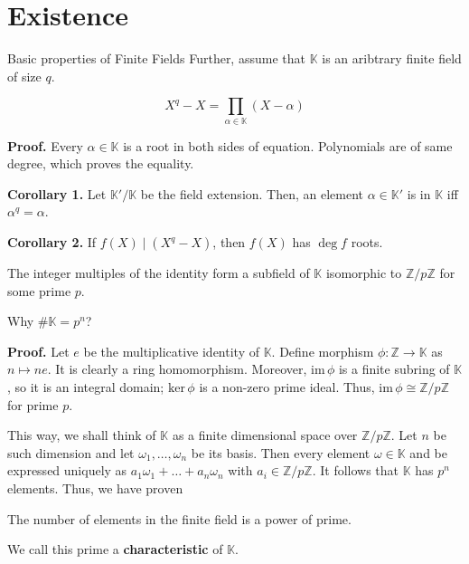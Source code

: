 \documentclass{zkdl-presentation-template}
\begin{document}
    \section{Existence}

    \begin{frame}{Basic properties of Finite Fields}
        Further, assume that $\mathbb{K}$ is an aribtrary finite field of size $q$.

        \begin{lemma}
            \[X^q - X = \prod_{\alpha \in \mathbb{K}}(X-\alpha)\]
        \end{lemma}

        \textbf{Proof.} Every $\alpha \in \mathbb{K}$ is a root in both sides of
        equation. Polynomials are of same degree, which proves the equality.

        \textbf{Corollary 1.} Let $\mathbb{K}'/\mathbb{K}$ be the field extension.
        Then, an element $\alpha \in \mathbb{K}'$ is in $\mathbb{K}$ iff
        $\alpha^q = \alpha$.

        \textbf{Corollary 2.} If $f(X) \mid (X^q-X)$, then $f(X)$ has $\deg f$
        roots.

        \begin{lemma}
            The integer multiples of the identity form a subfield of
            $\mathbb{K}$ isomorphic to $\mathbb{Z}/p\mathbb{Z}$ for some prime $p$.
        \end{lemma}
    \end{frame}

    \begin{frame}{Why $\#\mathbb{K} = p^n$?} 
        
        \textbf{Proof.}
        Let $e$ be the multiplicative identity of $\mathbb{K}$. Define morphism
        $\phi: \mathbb{Z} \to \mathbb{K}$ as $n \mapsto ne$. It is clearly a
        ring homomorphism. Moreover, $\text{im}\,\phi$ is a finite subring of
        $\mathbb{K}$, so it is an integral domain; $\text{ker}\,\phi$ is a
        non-zero prime ideal. Thus, $\text{im}\,\phi \cong
        \mathbb{Z}/p\mathbb{Z}$ for prime $p$.

        This way, we shall think of $\mathbb{K}$ as a finite dimensional space
        over $\mathbb{Z}/p\mathbb{Z}$. Let $n$ be such dimension and let
        $\omega_1,\dots,\omega_n$ be its basis. Then every element $\omega \in
        \mathbb{K}$ and be expressed uniquely as $a_1\omega_1+\dots+a_n\omega_n$
        with $a_i \in \mathbb{Z}/p\mathbb{Z}$. It follows that $\mathbb{K}$ has 
        $p^n$ elements. Thus, we have proven

        \begin{lemma}
            The number of elements in the finite field is a power of prime. 
        \end{lemma}

        We call this prime a \textbf{characteristic} of $\mathbb{K}$.
    \end{frame}
\end{document}
